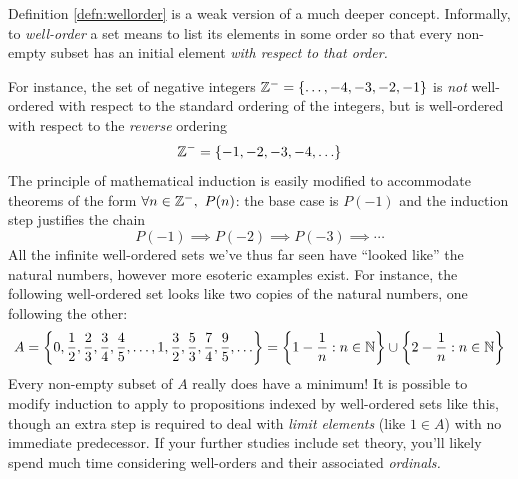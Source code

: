 \begin{aside}{}{}

	Definition \ref{defn:wellorder} is a weak version of a much deeper concept. Informally, to \emph{well-order} a set means to list its elements in some order so that every non-empty subset has an initial element \emph{with respect to that order.}\par
	For instance, the set of negative integers $\mathbb{Z}^-=\{\ldots,-4,-3,-2,-1\}$ is \emph{not} well-ordered with respect to the standard ordering of the integers, but is well-ordered with respect to the \emph{reverse} ordering
	\[
		\mathbb{Z}^-=\{-1,-2,-3,-4,\ldots\}
	\]
	The principle of mathematical induction is easily modified to accommodate theorems of the form $\forall n\in\Z^-,\ P(n)$: the base case is $P(-1)$ and the induction step justifies the chain
	\[
		P(-1)\implies P(-2)\implies P(-3)\implies\cdots
	\]
	All the infinite well-ordered sets we've thus far seen have ``looked like'' the natural numbers, however more esoteric examples exist. For instance, the following well-ordered set looks like two copies of the natural numbers, one following the other:
	\[
		A=\left\{0,\frac 12,\frac 23,\frac 34,\frac 45,\ldots,1,\frac 32,\frac 53,\frac 74,\frac 95,\ldots\right\}=\left\{1-\frac 1n:n\in\mathbb{N}\right\}\cup\left\{2-\frac 1n:n\in\mathbb{N}\right\}
	\]
	Every non-empty subset of $A$ really does have a minimum!	It is possible to modify induction to apply to propositions indexed by well-ordered sets like this, though an extra step is required to deal with \emph{limit elements} (like $1\in A$) with no immediate predecessor. If your further studies include set theory, you'll likely spend much time considering well-orders and their associated \emph{ordinals.}
\end{aside}


